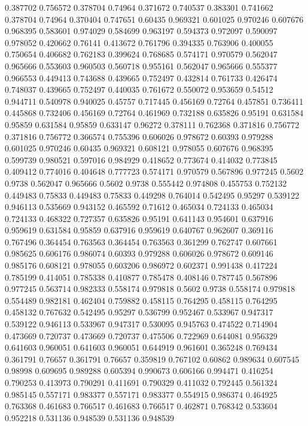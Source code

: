 0.387702 0.756572
0.378704 0.74964
0.371672 0.740537
0.383301 0.741662
0.378704 0.74964
0.370404 0.747651
0.60435 0.969321
0.601025 0.970246
0.607676 0.968395
0.583601 0.974029
0.584699 0.963197
0.594373 0.972097
0.590097 0.978052
0.420662 0.76141
0.413672 0.761796
0.394335 0.763906
0.400055 0.750654
0.406682 0.762183
0.399624 0.768685
0.574171 0.970579
0.562047 0.965666
0.553603 0.960503
0.560718 0.955161
0.562047 0.965666
0.555377 0.966553
0.449413 0.743688
0.439665 0.752497
0.432814 0.761733
0.426474 0.748037
0.439665 0.752497
0.440035 0.761672
0.550072 0.953659
0.54512 0.944711
0.540978 0.940025
0.45757 0.717445
0.456169 0.72764
0.457851 0.736411
0.445868 0.732406
0.456169 0.72764
0.461969 0.732188
0.635826 0.95191
0.631584 0.95859
0.631584 0.95859
0.633147 0.96272
0.378111 0.762368
0.371816 0.756772
0.371816 0.756772
0.366574 0.755396
0.606026 0.978672
0.60393 0.979288
0.601025 0.970246
0.60435 0.969321
0.608121 0.978055
0.607676 0.968395
0.599739 0.980521
0.597016 0.984929
0.418652 0.773674
0.414032 0.773845
0.409412 0.774016
0.404648 0.777723
0.574171 0.970579
0.567896 0.977245
0.5602 0.9738
0.562047 0.965666
0.5602 0.9738
0.555442 0.974808
0.455753 0.752132
0.449483 0.75833
0.449483 0.75833
0.449298 0.764014
0.542495 0.95297
0.539122 0.946113
0.535669 0.943152
0.465592 0.71612
0.465034 0.724133
0.465034 0.724133
0.468322 0.727357
0.635826 0.95191
0.641143 0.954601
0.637916 0.959619
0.631584 0.95859
0.637916 0.959619
0.640767 0.962607
0.369116 0.767496
0.364454 0.763563
0.364454 0.763563
0.361299 0.762747
0.607661 0.985625
0.606176 0.986074
0.60393 0.979288
0.606026 0.978672
0.609146 0.985176
0.608121 0.978055
0.603206 0.986972
0.602371 0.991438
0.417224 0.785199
0.414051 0.785338
0.410877 0.785478
0.408146 0.787745
0.567896 0.977245
0.563714 0.982333
0.558174 0.979818
0.5602 0.9738
0.558174 0.979818
0.554489 0.982181
0.462404 0.759882
0.458115 0.764295
0.458115 0.764295
0.458132 0.767632
0.542495 0.95297
0.536799 0.952467
0.533967 0.947317
0.539122 0.946113
0.533967 0.947317
0.530095 0.945763
0.474522 0.714904
0.473669 0.720737
0.473669 0.720737
0.475506 0.722969
0.644081 0.956329
0.641603 0.960051
0.641603 0.960051
0.644919 0.961601
0.365248 0.769434
0.361791 0.76657
0.361791 0.76657
0.359819 0.767102
0.60862 0.989634
0.607545 0.98998
0.609695 0.989288
0.605394 0.990673
0.606166 0.994471
0.416254 0.790253
0.413973 0.790291
0.411691 0.790329
0.411032 0.792445
0.561324 0.985145
0.557171 0.983377
0.557171 0.983377
0.554915 0.986374
0.464925 0.763368
0.461683 0.766517
0.461683 0.766517
0.462871 0.768342
0.533604 0.952218
0.531136 0.948539
0.531136 0.948539
